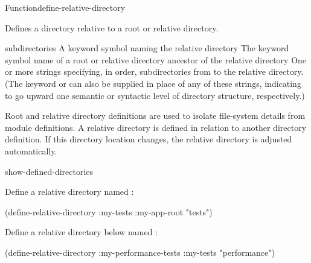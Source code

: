 \documentclass[10pt,twoside,english,pdftex]{article}
\begin{document}

\begin{functiondoc}{Function}{define-relative-directory}{  } 
%
%
%
%

\fnsyntax 

\fnpurpose Defines a directory relative to a root or relative directory.

\fnpackage {}

\fnmodule {}

\fnargs
\begin{args}{subdirectories}
 A keyword symbol naming the relative directory
\arg[directory] The keyword symbol name of a root or relative directory
ancestor of the relative directory
\arg[subdirectories] One or more strings specifying, in order, subdirectories
from  to the relative directory. (The keyword  or
 can also be supplied in place of any of these strings, indicating
to go upward one semantic or syntactic level of directory structure,
respectively.)
\end{args}

\fndescription Root and relative directory definitions are used to
isolate file-system details from module definitions.  A relative
directory is defined in relation to another directory definition.  If
this directory location changes, the relative directory is adjusted
automatically.

\begin{alsos}{show-defined-directories}
\end{alsos}

\fnexamples Define a relative directory named :
\begin{example}
  (define-relative-directory :my-tests :my-app-root "tests")
\end{example}

Define a relative directory below  named
: 
\begin{example}
  (define-relative-directory :my-performance-tests :my-tests "performance") 
\end{example}

\end{functiondoc}
\end{document}
